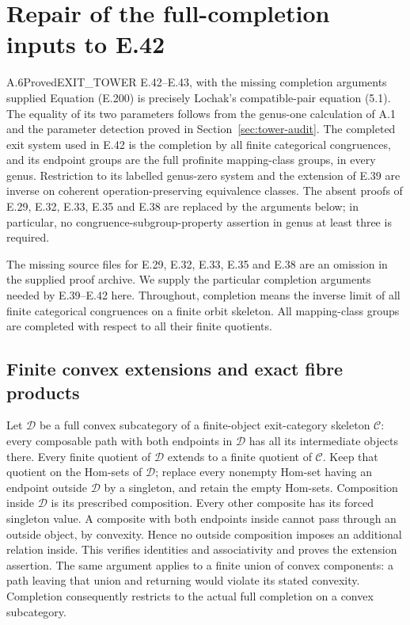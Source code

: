 \section{Repair of the full-completion inputs to E.42}
\label{sec:completion-repair}

\begin{result}{A.6}{Proved}{EXIT\_TOWER E.42--E.43, with the missing completion arguments supplied}
Equation (E.200) is precisely Lochak's compatible-pair equation (5.1).
The equality of its two parameters follows from the genus-one calculation
of A.1 and the parameter detection proved in Section~\ref{sec:tower-audit}.
The completed exit system used in E.42 is the completion by all finite
categorical congruences, and its endpoint groups are the full profinite
mapping-class groups, in every genus.  Restriction to its labelled
genus-zero system and the extension of E.39 are inverse on coherent
operation-preserving equivalence classes.  The absent proofs of E.29,
E.32, E.33, E.35 and E.38 are replaced by the arguments below; in
particular, no congruence-subgroup-property assertion in genus at
least three is required.
\end{result}

The missing source files for E.29, E.32, E.33, E.35 and E.38 are an
omission in the supplied proof archive.  We supply the particular
completion arguments needed by E.39--E.42 here.  Throughout, completion
means the inverse limit of all finite categorical congruences on a
finite orbit skeleton.  All mapping-class groups are completed with
respect to all their finite quotients.

\subsection{Finite convex extensions and exact fibre products}

Let $\mathcal D$ be a full convex subcategory of a finite-object
exit-category skeleton $\mathcal C$: every composable path with both
endpoints in $\mathcal D$ has all its intermediate objects there.
Every finite quotient of $\mathcal D$ extends to a finite quotient
of $\mathcal C$.  Keep that quotient on the Hom-sets of $\mathcal D$;
replace every nonempty Hom-set having an endpoint outside
$\mathcal D$ by a singleton, and retain the empty Hom-sets.
Composition inside $\mathcal D$ is its prescribed composition.
Every other composite has its forced singleton value.  A composite
with both endpoints inside cannot pass through an outside object,
by convexity.  Hence no outside composition imposes an additional
relation inside.  This verifies identities and associativity and
proves the extension assertion.  The same argument applies to a finite
union of convex components: a path leaving that union and returning
would violate its stated convexity.  Completion consequently restricts
to the actual full completion on a convex subcategory.

